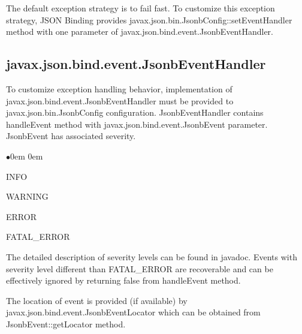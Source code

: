 The default exception strategy is to fail fast. To customize this exception strategy, JSON Binding provides javax.json.bin.JsonbConfig::setEventHandler method with one parameter of javax.json.bind.event.JsonbEventHandler.

\subsection{javax.json.bind.event.JsonbEventHandler}
\label{subsec:JsonbEventHandler}

To customize exception handling behavior, implementation of javax.json.bind.event.JsonbEventHandler must be provided to javax.json.bin.JsonbConfig configuration. JsonbEventHandler contains handleEvent method with javax.json.bind.event.JsonbEvent parameter. JsonbEvent has associated severity.

\begin{list}{$\bullet$}{\parsep 0em  0em}
\item INFO
\item WARNING
\item ERROR
\item FATAL\_ERROR
\end{list}

The detailed description of severity levels can be found in javadoc. Events with severity level different than FATAL\_ERROR are recoverable and can be effectively ignored by returning false from handleEvent method.

The location of event is provided (if available) by javax.json.bind.event.JsonbEventLocator which can be obtained from JsonbEvent::getLocator method.
